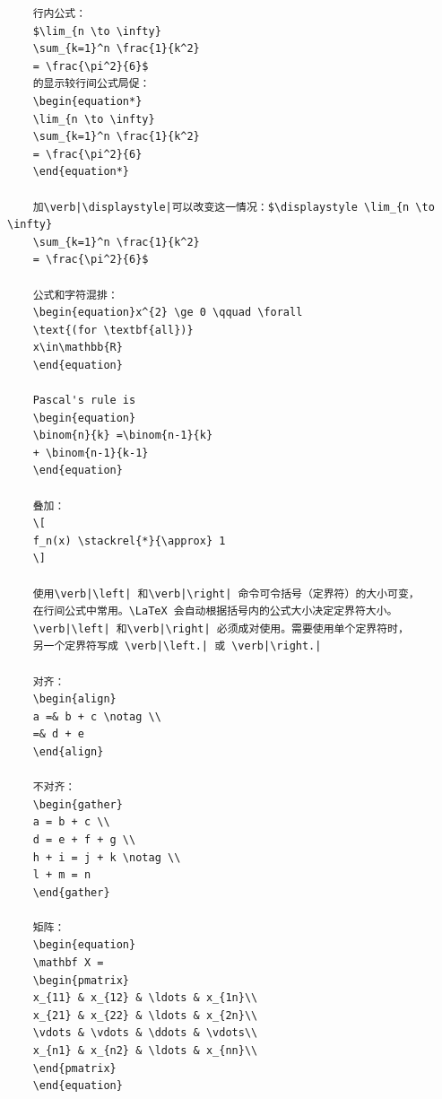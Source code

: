 \documentclass[a4paper]{article} %
\numberwithin{equation}{section} %
\begin{document}
\begin{verbatim}
    行内公式：
    $\lim_{n \to \infty}
    \sum_{k=1}^n \frac{1}{k^2}
    = \frac{\pi^2}{6}$
    的显示较行间公式局促：
    \begin{equation*}
    \lim_{n \to \infty}
    \sum_{k=1}^n \frac{1}{k^2}
    = \frac{\pi^2}{6}
    \end{equation*}
    
    加\verb|\displaystyle|可以改变这一情况：$\displaystyle \lim_{n \to \infty}
    \sum_{k=1}^n \frac{1}{k^2}
    = \frac{\pi^2}{6}$
    
    公式和字符混排：
    \begin{equation}x^{2} \ge 0 \qquad \forall
    \text{(for \textbf{all})}
    x\in\mathbb{R}
    \end{equation}
    
    Pascal's rule is
    \begin{equation}
    \binom{n}{k} =\binom{n-1}{k}
    + \binom{n-1}{k-1}
    \end{equation}
    
    叠加：
    \[
    f_n(x) \stackrel{*}{\approx} 1
    \]
    
    使用\verb|\left| 和\verb|\right| 命令可令括号（定界符）的大小可变，
    在行间公式中常用。\LaTeX 会自动根据括号内的公式大小决定定界符大小。
    \verb|\left| 和\verb|\right| 必须成对使用。需要使用单个定界符时，
    另一个定界符写成 \verb|\left.| 或 \verb|\right.|
    
    对齐：
    \begin{align}
    a =& b + c \notag \\
    =& d + e
    \end{align}
    
    不对齐：
    \begin{gather}
    a = b + c \\
    d = e + f + g \\
    h + i = j + k \notag \\
    l + m = n
    \end{gather}
    
    矩阵：
    \begin{equation}
    \mathbf X = 
    \begin{pmatrix}
    x_{11} & x_{12} & \ldots & x_{1n}\\
    x_{21} & x_{22} & \ldots & x_{2n}\\
    \vdots & \vdots & \ddots & \vdots\\
    x_{n1} & x_{n2} & \ldots & x_{nn}\\
    \end{pmatrix}
    \end{equation}
    

\end{verbatim}
\end{document}
